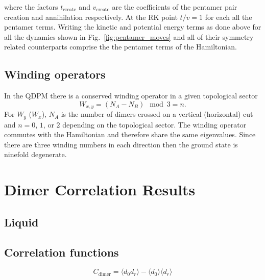 \documentclass[aps,floatfix,11pt,twocolumn]{revtex4-1}
\begin{document}
        where the factors $t_{\mathrm{create}}$ and $v_{\mathrm{create}}$ are the coefficients of
        the pentamer pair creation and annihilation respectively. At the RK point
        $t/v=1$ for each all the pentamer terms. 
        Writing the kinetic and potential energy terms as done above for all the dynamics shown in
        Fig.~\ref{fig:pentamer_moves} and all of their symmetry related counterparts comprise the
        the pentamer terms of the Hamiltonian. 

    \subsection{Winding operators}

        In the QDPM there is a conserved winding operator in a given topological sector
        \begin{equation}
            W_{x,y} = (N_A - N_B)\mod{3} = n
            .
        \end{equation}
        For $W_y$ ($W_x$), $N_A$ is the number of dimers crossed on a vertical (horizontal) cut and
        $n=0$, $1$, or $2$ depending on the topological sector. The winding operator commutes with
        the Hamiltonian and therefore share the same eigenvalues. Since there are three winding numbers in
        each direction then the ground state is ninefold degenerate.

\section{Dimer Correlation Results}

    \subsection{Liquid}


    \subsection{Correlation functions}

    \begin{equation}
        C_{\mathrm{dimer}} = \langle d_0 d_r \rangle - \langle d_0 \rangle   \langle d_r \rangle   
    \end{equation}
\end{document}
